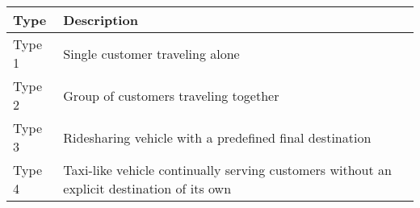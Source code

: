 \begin{tabular}{|l|l|}
\hline Type   & Description \\
\hline
Type 1 & Single customer traveling alone \\
Type 2 & Group of customers traveling together \\
\hline
Type 3 & Ridesharing vehicle with a predefined final
    destination \\
Type 4 & Taxi-like vehicle continually serving customers without an
    explicit destination of its own \\
\hline
\end{tabular}
